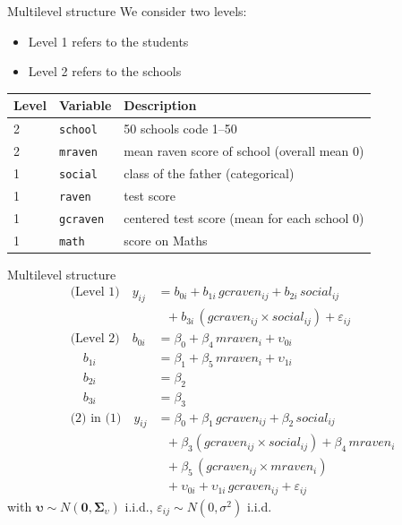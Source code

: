 \documentclass{beamer}
\newcommand{\gvect}[1]{\boldsymbol{#1}}
\newcommand{\gmat}[1]{\boldsymbol{#1}}
\begin{document}
\begin{frame}{Multilevel structure}
  We consider two levels:
  \begin{itemize}
    \item Level 1 refers to the students
    \item Level 2 refers to the schools
  \end{itemize}
  \vspace{.5cm}
    \begin{tabular}{llp{8cm}}
      Level & Variable & Description \\
    \hline
      2 & \texttt{school} & 50 schools code 1--50 \\
      2 & \texttt{mraven} & mean raven score of school (overall mean 0) \\
      1 & \texttt{social} & class of the father (categorical) \\
      1 & \texttt{raven} & test score \\
      1 & \texttt{gcraven} & centered test score (mean for each school 0)\\
      1 & \texttt{math} & score on Maths \\
     \hline
  \end{tabular}
\end{frame}

\begin{frame}{Multilevel structure}
\begin{align*}
\text{(Level 1)} \quad y_{ij} &= b_{0i} + b_{1i}\,gcraven_{ij} + b_{2i}\,social_{ij}\\
                            &~~~ + b_{3i}\,(gcraven_{ij}\times social_{ij}) + \varepsilon_{ij}\\
\text{(Level 2)} \quad b_{0i} &= \beta_0 + \beta_4\,mraven_i + \upsilon_{0i} \\
                 \quad b_{1i} &= \beta_1 + \beta_5\,mraven_i + \upsilon_{1i}\\
                 \quad b_{2i} &= \beta_2\\
                 \quad b_{3i} &= \beta_3\\
\text{(2) in (1)} \quad y_{ij} &= \beta_{0} + \beta_{1}\,gcraven_{ij} + \beta_{2}\,social_{ij}\\
                            &~~~ + \beta_{3}(gcraven_{ij}\times social_{ij}) + \beta_{4}\,mraven_i\\
                            &~~~ + \beta_{5}\,(gcraven_{ij} \times mraven_{i})\\
                            &~~~ + \upsilon_{0i} + \upsilon_{1i}\,gcraven_{ij} + \varepsilon_{ij}
\end{align*}
with $\gvect\upsilon \sim N(\gvect 0, \gmat{\Sigma}_\upsilon)$ i.i.d.,
$\varepsilon_{ij} \sim N(0, \sigma^2)$ i.i.d.
\end{frame}
\end{document}
